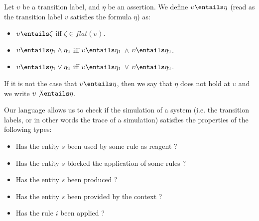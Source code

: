 \begin{definition}[Semantics]\label{sec:semantics}
Let  $\upsilon$ be  a transition label, and $\eta$ be an assertion.
We define $\upsilon \entails \eta$ (read as the transition label $v$ satisfies the formula $\eta$) as: 
\begin{itemize}
 \item   $\upsilon \entails \zeta $ iff $\zeta \in flat(\upsilon)$. 
 \item   $\upsilon \entails \eta_1 \wedge \eta_2$ iff   $\upsilon \entails \eta_1$  $\wedge$  $\upsilon \entails \eta_2$.
\item   $ \upsilon \entails \eta_1 \vee \eta_2$ iff   $\upsilon \entails \eta_1$  $\vee$  $\upsilon \entails \eta_2$.
\end{itemize}
If it is not the case that $\upsilon \entails  \eta $, then we say that $\eta$ does not hold at $\upsilon$ and we write $\upsilon \not\entails \eta$. 
\end{definition}


Our  language allows us to check if the simulation of a system (i.e. the transition labels, or in other words the trace of a simulation) 
satisfies the properties of the following types:%
\begin{itemize}
\item Has the entity $s$ been used by some rule as reagent ?
\item Has the entity $s$ blocked  the application of some rules ?
\item Has the entity $s$ been produced ?
\item Has the entity $s$ been provided by the context ?
\item Has the rule $i$ been applied ?
\end{itemize}


